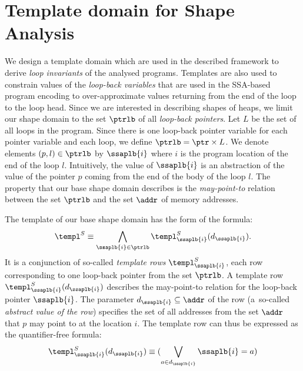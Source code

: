 {\section{Template domain for Shape Analysis}
We design a template domain which are used in the described framework to
derive \emph{loop invariants} of the analysed programs.
Templates are also used to constrain values of the \emph{loop-back variables} that are
used in the SSA-based program encoding to over-approximate values returning from
the end of the loop to the loop head.
%
Since we are interested in describing shapes of heaps,
we limit our shape domain to the set $\ptrlb$ of all \emph{loop-back pointers}. 
%
Let $L$ be the set of all loops in the program. 
%
Since there is one loop-back pointer variable for each pointer variable and
each loop, we define $\ptrlb = \ptr \times L$.
%
We denote elements $(p, l) \in \ptrlb$ by $\ssaplb{i}$ where $i$ is the program
location of the end of the loop $l$.
%
Intuitively, the value of $\ssaplb{i}$ is an abstraction of the value of the
pointer $p$ coming from the end of the body of the loop $l$.
%
The property that our base shape domain describes is the
\emph{may-point-to} relation between the set $\ptrlb$ and the set
$\addr$ of memory addresses.

The template of our base shape domain has the form of the formula:
\begin{equation}\label{eq:templ_shape}
\begin{split}
\templ^S \equiv \bigwedge_{\ssaplb{i} \in \ptrlb}
\templ^S_{\ssaplb{i}}(d_{\ssaplb{i}}).
\end{split}
\end{equation}
%
It is a conjunction of so-called \emph{template rows} $\templ^S_{\ssaplb{i}}$,
each row corresponding to one loop-back pointer from the set $\ptrlb$.
%
A template row $\templ^S_{\ssaplb{i}}(d_{\ssaplb{i}})$ describes the
may-point-to relation for the loop-back pointer $\ssaplb{i}$.
%
The parameter $d_{\ssaplb{i}} \subseteq \addr$ of the row (a~so-called
\emph{abstract value of the row}) specifies the set of all addresses from the
set $\addr$ that $p$ may point to at the location $i$.
%
The template row can thus be expressed as the quantifier-free formula:
\begin{equation}\label{eq:templ_row}
\begin{split}
\templ^S_{\ssaplb{i}}(d_{\ssaplb{i}}) \equiv (\bigvee_{a \in
d_{\ssaplb{i}}} \ssaplb{i} = a)
\end{split}
\end{equation}
  
}
